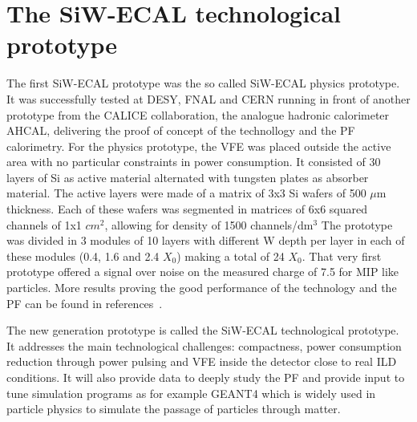 \documentclass[final,3p,times,twocolumn]{elsarticle}
\begin{document}
\section{The SiW-ECAL technological prototype}

The first SiW-ECAL prototype was the so called SiW-ECAL physics prototype.
It was successfully tested at DESY, FNAL and CERN running in front of another prototype from the CALICE
collaboration, the analogue hadronic calorimeter AHCAL, delivering the proof of concept of the technollogy
and the PF calorimetry.
For the physics prototype, the VFE was placed outside the active area with no particular constraints in power consumption.
It consisted of 30 layers of Si as active material alternated with tungsten plates as absorber material.
The active layers were made of a matrix of 3x3 Si wafers of 500 $\mu$m thickness. Each of these wafers was segmented in matrices of
6x6 squared channels of 1x1 $cm^{2}$, allowing for density of 1500 channels/dm$^{3}$
The prototype was divided in 3 modules of 10 layers with different W depth per layer in each of these modules
(0.4, 1.6 and 2.4 $X_{0}$) making a total of 24 $X_{0}$.
That very first prototype offered a signal over noise on the measured charge of 7.5 for MIP like 
particles. More results proving the good performance of the technology and the PF can be found in
references~\cite{Adloff:2011ha,Anduze:2008hq,Adloff:2008aa,Adloff:2010xj,CALICE:2011aa,Bilki:2014uep}.

The new generation prototype is called the SiW-ECAL technological prototype. It addresses the main technological challenges: compactness,
power consumption reduction through power pulsing and VFE inside the detector close to real ILD conditions.
It will also provide data to deeply study the PF and provide input to tune simulation programs as for example
GEANT4\cite{Agostinelli:2002hh,Allison:2006ve,Allison:2016lfl} which is widely used
in particle physics to simulate the passage of particles through matter.
\end{document}

